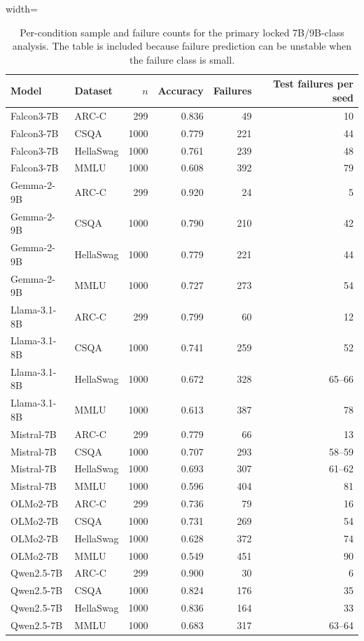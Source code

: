 
\begin{table}[t]
\centering
\scriptsize
\caption{Per-condition sample and failure counts for the primary locked 7B/9B-class analysis. The table is included because failure prediction can be unstable when the failure class is small.}
\label{tab:locked-failure-counts}
\begin{adjustbox}{width=\textwidth}
\begin{tabular}{llrrrr}
\toprule
Model & Dataset & $n$ & Accuracy & Failures & Test failures per seed \\
\midrule
Falcon3-7B & ARC-C & 299 & 0.836 & 49 & 10 \\
Falcon3-7B & CSQA & 1000 & 0.779 & 221 & 44 \\
Falcon3-7B & HellaSwag & 1000 & 0.761 & 239 & 48 \\
Falcon3-7B & MMLU & 1000 & 0.608 & 392 & 79 \\
Gemma-2-9B & ARC-C & 299 & 0.920 & 24 & 5 \\
Gemma-2-9B & CSQA & 1000 & 0.790 & 210 & 42 \\
Gemma-2-9B & HellaSwag & 1000 & 0.779 & 221 & 44 \\
Gemma-2-9B & MMLU & 1000 & 0.727 & 273 & 54 \\
Llama-3.1-8B & ARC-C & 299 & 0.799 & 60 & 12 \\
Llama-3.1-8B & CSQA & 1000 & 0.741 & 259 & 52 \\
Llama-3.1-8B & HellaSwag & 1000 & 0.672 & 328 & 65--66 \\
Llama-3.1-8B & MMLU & 1000 & 0.613 & 387 & 78 \\
Mistral-7B & ARC-C & 299 & 0.779 & 66 & 13 \\
Mistral-7B & CSQA & 1000 & 0.707 & 293 & 58--59 \\
Mistral-7B & HellaSwag & 1000 & 0.693 & 307 & 61--62 \\
Mistral-7B & MMLU & 1000 & 0.596 & 404 & 81 \\
OLMo2-7B & ARC-C & 299 & 0.736 & 79 & 16 \\
OLMo2-7B & CSQA & 1000 & 0.731 & 269 & 54 \\
OLMo2-7B & HellaSwag & 1000 & 0.628 & 372 & 74 \\
OLMo2-7B & MMLU & 1000 & 0.549 & 451 & 90 \\
Qwen2.5-7B & ARC-C & 299 & 0.900 & 30 & 6 \\
Qwen2.5-7B & CSQA & 1000 & 0.824 & 176 & 35 \\
Qwen2.5-7B & HellaSwag & 1000 & 0.836 & 164 & 33 \\
Qwen2.5-7B & MMLU & 1000 & 0.683 & 317 & 63--64 \\
\bottomrule
\end{tabular}
\end{adjustbox}
\end{table}
